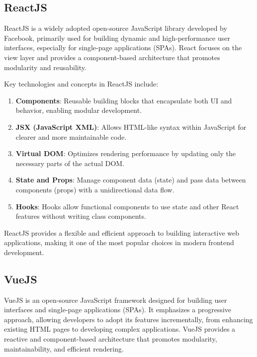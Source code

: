\subsection{ReactJS}

ReactJS is a widely adopted open-source JavaScript library developed by Facebook, primarily used for building dynamic and high-performance user interfaces, especially for single-page applications (SPAs). React focuses on the view layer and provides a component-based architecture that promotes modularity and reusability.\cite{ReactJS}

Key technologies and concepts in ReactJS include:
\begin{enumerate}
    \item \textbf{Components}: Reusable building blocks that encapsulate both UI and behavior, enabling modular development.
    \item \textbf{JSX (JavaScript XML)}: Allows HTML-like syntax within JavaScript for clearer and more maintainable code.
    \item \textbf{Virtual DOM}: Optimizes rendering performance by updating only the necessary parts of the actual DOM.
    \item \textbf{State and Props}: Manage component data (state) and pass data between components (props) with a unidirectional data flow.
    \item \textbf{Hooks}: Hooks allow functional components to use state and other React features without writing class components. 
\end{enumerate}

ReactJS provides a flexible and efficient approach to building interactive web applications, making it one of the most popular choices in modern frontend development.

\subsection{VueJS}

VueJS is an open-source JavaScript framework designed for building user interfaces and single-page applications (SPAs). It emphasizes a progressive approach, allowing developers to adopt its features incrementally, from enhancing existing HTML pages to developing complex applications. VueJS provides a reactive and component-based architecture that promotes modularity, maintainability, and efficient rendering.\cite{VueJS}


